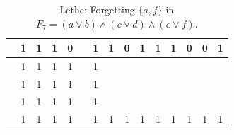 \begin{table}[!tb]
\begin{tabular}{|c|c|c|c|c|c|c|c|c|c|c|c|c|c|c|}
        \rowcolor{yellow!40}  & 1 & 1 & 1 & 0 &  & 1 & 1 & 0 & 1 & 1 & 1 & 0 & 0 & 1 \\ \hline
        \rowcolor{gray!40}  & 1 & 1 & 1 & 1 &  & 1 &  &  &  &  &  &  &  &  \\ \hline
        \rowcolor{gray!40}  & 1 & 1 & 1 & 1 &  & 1 &  &  &  &  &  &  &  &  \\ \hline
        \rowcolor{gray!40}  & 1 & 1 & 1 & 1 &  & 1 &  &  &  &  &  &  &  &  \\ \hline
        \rowcolor{gray!40}  & 1 & 1 & 1 & 1 &  & 1 & 1 & 1 & 1 & 1 & 1 & 1 & 1 & 1 \\ \hline
    \end{tabular}
    \caption{Lethe: Forgetting $\{a, f\}$ in $F_{7} = (a \lor b) \land (c \lor d) \land (e \lor f)$.}
    \label{tab:lethe-F7-af}
\end{table}
